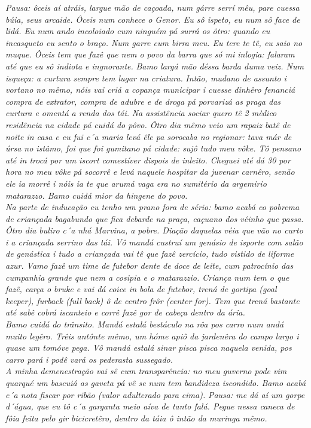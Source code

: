 \documentclass[12pt,brazil,]{book}
\begin{document}
\emph{Pausa: ôceis aí atráis, largue mão de caçoada, num gárre serrí
mêu, pare cuessa búia, seus arcaide. Ôceis num conhece o Genor. Eu sô
ispeto, eu num sô face de lidá. Eu num ando incoloiado cum ninguém pá
surrá os ôtro: quando eu incasqueto eu sento o braço. Num garre cum
birra meu. Eu tere te tê, eu saio no muque. Ôceis tem que fazê que nem o
povo da barra que só mi inlogia: falaram até que eu sô indiota e
ingnorante.} \emph{Bamo largá mão déssa barda duma veiz. Num isqueça: a
curtura sempre tem lugar na criatura.} \emph{Intão, mudano de assunto i
vortano no mêmo, nóis vai criá a copança municipar i cuesse dinhêro
fenanciá compra de extrator, compra de adubre e de droga pá porvarizá as
praga das curtura e omentá a renda dos tái.} \emph{Na assistência sociar
quero tê 2 mèdico residência na cidade pá cuidá do pôvo. Ôtro dia mêmo
veio um rapaiz batê de noite in casa e eu fui c´a maria levá êle pa
sorocaba no regionar: tava már de úrsa no istâmo, foi que foi gumitano
pá cidade: sujô tudo meu vôke. Tô pensano até in trocá por um iscort
comestíver dispois de inleito. Cheguei até dá 30 por hora no meu vôke pá
socorrê e levá naquele hospitar da juvenar carnêro, senão ele ia morrê i
nóis ia te que arumá vaga era no sumitério da argemirio matarazzo. Bamo
cuidá mior da hingene do povo.}\\
\emph{Na parte de inducação eu tenho um prano fora de sério: bamo acabá
co pobrema de criançada bagabundo que fica debarde na praça, caçuano dos
véinho que passa. Ôtro dia buliro c´a nhá Marvina, a pobre. Diação
daquelas véia que vão no curto i a criançada serrino das tái. Vô mandá
custruí um genásio de isporte com salão de genástica i tudo a criançada
vai tê que fazê zercício, tudo vistido de liforme azur. Vamo fazê um
time de futebor dente de doce de leite, cum patrocínio das cumpanhia
grande que nem a cosipia e o matarazzio. Criança num tem o que fazê,
carça o bruke e vai dá coice in bola de futebor, trená de gortipa (goal
keeper), furback (full back) ô de centro frôr (center for). Tem que
trená bastante até sabê cobrá iscanteio e corrê fazê gor de cabeça
dentro da ária.}\\
\emph{Bamo cuidá do trânsito. Mandá estalá bestáculo na rôa pos carro
num andá muito legêro. Trêis antônte mêmo, um hóme apiô da jardenêra do
campo largo i quase um tomóve pega. Vô mandá estalá sinar pisca pisca
naquela venida, pos carro pará i podê vará os pederasta sussegado.}\\
\emph{A minha demenestração vai sê cum transparência: no meu guverno
pode vim quarqué um bascuiá as gaveta pá vê se num tem bandideza
iscondido. Bamo acabá c´a nota fiscar por ribão (valor adulterado para
cima).} \emph{Pausa: me dá aí um gorpe d´água, que eu tô c´a garganta
meio aíva de tanto falá. Pegue nessa caneca de fôia feita pelo gir
bicicretêro, dentro da táia ô intão da muringa mêmo.}\\
\end{document}
